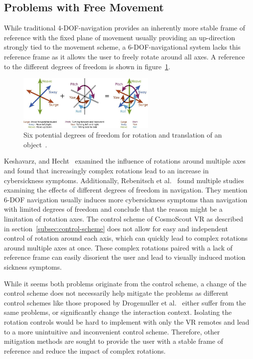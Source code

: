 \subsection{Problems with Free Movement}\label{subsec:problems-with-free-movement}

While traditional 4-DOF-navigation provides an inherently more stable frame of reference with the fixed plane of
movement usually providing an up-direction strongly tied to the movement scheme, a 6-DOF-navigational system lacks this
reference frame as it allows the user to freely rotate around all axes.
A reference to the different degrees of freedom is shown in figure~\ref{fig:6-dof-reference}.

\begin{figure}[h]
    \centering
    \includegraphics[width=0.6\textwidth]{content/3_current_state/img/6-DOF-reference[Fragaszy2018]}
    \caption{Six potential degrees of freedom for rotation and translation of an object~\cite{Fragaszy2018}.}
    \label{fig:6-dof-reference}
\end{figure}

Keshavarz, and Hecht~\cite{Keshavarz2011b} examined the influence of rotations around multiple axes and found that
increasingly complex rotations lead to an increase in cybersickness symptoms.
Additionally, Rebenitsch et al.~\cite{Rebenitsch2016} found multiple studies examining the effects of different
degrees of freedom in navigation.
They mention 6-DOF navigation usually induces more cybersickness symptoms than navigation with limited degrees of
freedom and conclude that the reason might be a limitation of rotation axes.
The control scheme of CosmoScout VR as described in section~\ref{subsec:control-scheme} does not allow for easy and
independent control of rotation around each axis, which can quickly lead to complex rotations around multiple axes at
once.
These complex rotations paired with a lack of reference frame can easily disorient the user and lead to visually
induced motion sickness symptoms.

While it seems both problems originate from the control scheme, a change of the control scheme does not necessarily
help mitigate the problems as different control schemes like those proposed by Drogemuller et al.~\cite{Drogemuller2020}
either suffer from the same problems, or significantly change the interaction context.
Isolating the rotation controls would be hard to implement with only the VR remotes and lead to a more unintuitive
and inconvenient control scheme.
Therefore, other mitigation methods are sought to provide the user with a stable frame of reference and reduce the
impact of complex rotations.


